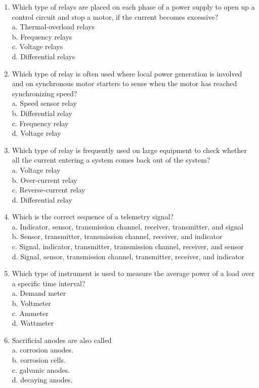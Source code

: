 \documentclass[10pt]{article}
\begin{document}
\begin{enumerate}
  \item Which type of relays are placed on each phase of a power supply to open up a control circuit and stop a motor, if the current becomes excessive?\\
a. Thermal-overload relays\\
b. Frequency relays\\
c. Voltage relays\\
d. Differential relays 

\item Which type of relay is often used where local power generation is involved and on synchronous motor starters to sense when the motor has reached synchronizing speed?\\
a. Speed sensor relay\\
b. Differential relay\\
c. Frequency relay\\
d. Voltage relay

  \item Which type of relay is frequently used on large equipment to check whether all the current entering a system comes back out of the system?\\
a. Voltage relay\\
b. Over-current relay\\
c. Reverse-current relay\\
d. Differential relay

  \item Which is the correct sequence of a telemetry signal?\\
a. Indicator, sensor, transmission channel, receiver, transmitter, and signal\\
b. Sensor, transmitter, transmission channel, receiver, and indicator\\
c. Signal, indicator, transmitter, transmission channel, receiver, and sensor\\
d. Signal, sensor, transmission channel, transmitter, receiver, and indicator

  \item Which type of instrument is used to measure the average power of a load over a specific time interval?\\
a. Demand meter\\
b. Voltmeter\\
c. Ammeter\\
d. Wattmeter

  \item Sacrificial anodes are also called\\
a. corrosion anodes.\\
b. corrosion cells.\\
c. galvanic anodes.\\
d. decaying anodes.


\end{enumerate}
\end{document}
